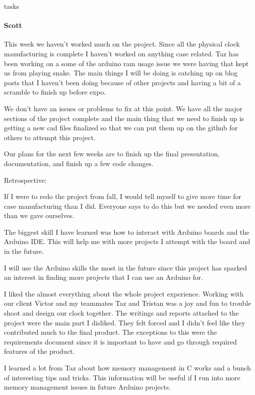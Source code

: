 tasks\documentclass[onecolumn, draftclsnofoot,10pt, compsoc]{IEEEtran}
\begin{document}
\paragraph{Scott}
This week we haven't worked much on the project. Since all the physical clock manufacturing is complete I haven't worked on anything case related. Taz has been working on a some of the arduino ram usage issue we were having that kept us from playing snake. The main things I will be doing is catching up on blog posts that I haven't been doing because of other projects and having a bit of a scramble to finish up before expo.

We don't have an issues or problems to fix at this point. We have all the major sections of the project complete and the main thing that we need to finish up is getting a new cad files finalized so that we can put them up on the github for others to attempt this project.

Our plans for the next few weeks are to finish up the final presentation, documentation, and finish up a few code changes.

Retrospective:

If I were to redo the project from fall, I would tell myself to give more time for case manufacturing than I did. Everyone says to do this but we needed even more than we gave ourselves.

The biggest skill I have learned was how to interact with Arduino boards and the Arduino IDE. This will help me with more projects I attempt with the board and in the future.

I will use the Arduino skills the most in the future since this project has sparked an interest in finding more projects that I can use an Arduino for.

I liked the almost everything about the whole project experience. Working with our client Victor and my teammates Taz and Tristan was a joy and fun to trouble shoot and design our clock together. The writings and reports attached to the project were the main part I disliked. They felt forced and I didn't feel like they contributed much to the final product. The exceptions to this were the requirements document since it is important to have and go through required features of the product.

I learned a lot from Taz about how memory management in C works and a bunch of interesting tips and tricks. This information will be useful if I run into more memory management issues in future Arduino projects.
\end{document}
